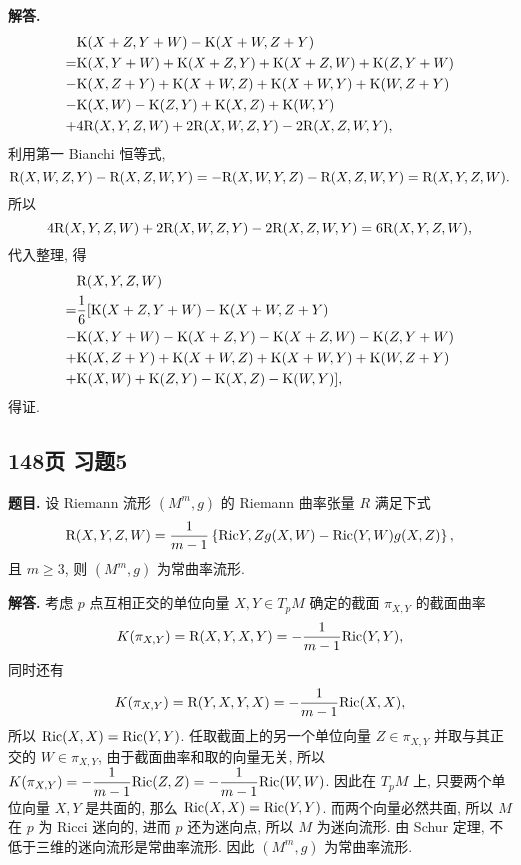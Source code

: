 \documentclass{ctexart}
\newcounter{problemname}
\newenvironment{problem}{\begin{shaded}\stepcounter{problemname}\par\noindent\textbf{题目\arabic{problemname}. }}{\end{shaded}\par}
\newenvironment{solution}{\par\noindent\textbf{解答. }}{\par}
\begin{document}
\begin{solution}
\[\begin{aligned}
             & \mathrm{K}(X + Z, Y + W) - \mathrm{K}(X + W, Z + Y) \\
            =& \mathrm{K}(X, Y + W) + \mathrm{K}(X + Z, Y) + \mathrm{K}(X + Z, W) + \mathrm{K}(Z, Y + W) \\
            -& \mathrm{K}(X, Z + Y) + \mathrm{K}(X + W, Z) + \mathrm{K}(X + W, Y) + \mathrm{K}(W, Z + Y) \\
            -& \mathrm{K}(X, W) - \mathrm{K}(Z, Y) + \mathrm{K}(X, Z) + \mathrm{K}(W, Y) \\
            +& 4\mathrm{R}(X, Y, Z, W) + 2\mathrm{R}(X, W, Z, Y) - 2\mathrm{R}(X, Z, W, Y),
        \end{aligned}
    \]
    利用第一 Bianchi 恒等式,
    \[
        \mathrm{R}(X, W, Z, Y) - \mathrm{R}(X, Z, W, Y) = -\mathrm{R}(X, W, Y, Z) - \mathrm{R}(X, Z, W, Y)  = \mathrm{R}(X, Y, Z, W).
    \]
    所以
    \[
        4\mathrm{R}(X, Y, Z, W) + 2\mathrm{R}(X, W, Z, Y) - 2\mathrm{R}(X, Z, W, Y) = 6\mathrm{R}(X, Y, Z, W),
    \]
    代入整理, 得
    \[
        \begin{aligned}
             & \mathrm{R}(X, Y, Z, W) \\
            =& \dfrac{1}{6}[\mathrm{K}(X + Z, Y + W) - \mathrm{K}(X + W, Z + Y) \\
            -& \mathrm{K}(X, Y + W) - \mathrm{K}(X + Z, Y) - \mathrm{K}(X + Z, W) - \mathrm{K}(Z, Y + W) \\
            +& \mathrm{K}(X, Z + Y) + \mathrm{K}(X + W, Z) + \mathrm{K}(X + W, Y) + \mathrm{K}(W, Z + Y) \\
            +& \mathrm{K}(X, W) + \mathrm{K}(Z, Y) - \mathrm{K}(X, Z) - \mathrm{K}(W, Y)], \\
       \end{aligned}
    \]
    得证.
\end{solution}

\subsection{148页 习题5}
\begin{problem}
    设 Riemann 流形 $(M^m, g)$ 的 Riemann 曲率张量 $R$ 满足下式
    \[
        \mathrm{R}(X, Y, Z, W) = \dfrac{1}{m - 1}\left\{\mathrm{Ric}{Y, Z}g(X, W) - \mathrm{Ric}(Y, W)g(X, Z)\right\},
    \]
    且 $m \geqslant 3$, 则 $(M^m, g)$ 为常曲率流形.
\end{problem}
\begin{solution}
    考虑 $p$ 点互相正交的单位向量 $X, Y \in T_pM$ 确定的截面 $\pi_{X, Y}$ 的截面曲率
    \[
        K(\pi_{X, Y}) = \mathrm{R}(X, Y, X, Y) = -\dfrac{1}{m - 1}\mathrm{Ric}(Y, Y),
    \]
    同时还有
    \[
        K(\pi_{X, Y}) = \mathrm{R}(Y, X, Y, X) = -\dfrac{1}{m - 1}\mathrm{Ric}(X, X),
    \]
    所以 $\mathrm{Ric}(X, X) = \mathrm{Ric}(Y, Y)$. 任取截面上的另一个单位向量 $Z \in \pi_{X, Y}$ 并取与其正交的 $W \in \pi_{X, Y}$, 由于截面曲率和取的向量无关, 所以 $K(\pi_{X, Y}) = -\dfrac{1}{m - 1}\mathrm{Ric}(Z, Z) = -\dfrac{1}{m - 1}\mathrm{Ric}(W, W)$. 因此在 $T_pM$ 上, 只要两个单位向量 $X, Y$ 是共面的, 那么 $\mathrm{Ric}(X, X) = \mathrm{Ric}(Y, Y)$. 而两个向量必然共面, 所以 $M$ 在 $p$ 为 Ricci 迷向的, 进而 $p$ 还为迷向点, 所以 $M$ 为迷向流形. 由 Schur 定理, 不低于三维的迷向流形是常曲率流形. 因此 $(M^m, g)$ 为常曲率流形.
\end{solution}
\end{document}
